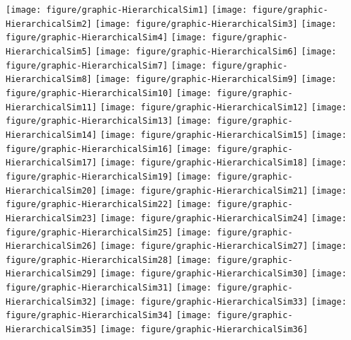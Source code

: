 \documentclass[12pt,letterpaper,oneside]{article}\usepackage{graphicx, color}
\newenvironment{knitrout}{}{} %
\begin{document}
\begin{knitrout}
{\centering \texttt{[image: figure/graphic-HierarchicalSim1]} 
\texttt{[image: figure/graphic-HierarchicalSim2]} 
\texttt{[image: figure/graphic-HierarchicalSim3]} 
\texttt{[image: figure/graphic-HierarchicalSim4]} 
\texttt{[image: figure/graphic-HierarchicalSim5]} 
\texttt{[image: figure/graphic-HierarchicalSim6]} 
\texttt{[image: figure/graphic-HierarchicalSim7]} 
\texttt{[image: figure/graphic-HierarchicalSim8]} 
\texttt{[image: figure/graphic-HierarchicalSim9]} 
\texttt{[image: figure/graphic-HierarchicalSim10]} 
\texttt{[image: figure/graphic-HierarchicalSim11]} 
\texttt{[image: figure/graphic-HierarchicalSim12]} 
\texttt{[image: figure/graphic-HierarchicalSim13]} 
\texttt{[image: figure/graphic-HierarchicalSim14]} 
\texttt{[image: figure/graphic-HierarchicalSim15]} 
\texttt{[image: figure/graphic-HierarchicalSim16]} 
\texttt{[image: figure/graphic-HierarchicalSim17]} 
\texttt{[image: figure/graphic-HierarchicalSim18]} 
\texttt{[image: figure/graphic-HierarchicalSim19]} 
\texttt{[image: figure/graphic-HierarchicalSim20]} 
\texttt{[image: figure/graphic-HierarchicalSim21]} 
\texttt{[image: figure/graphic-HierarchicalSim22]} 
\texttt{[image: figure/graphic-HierarchicalSim23]} 
\texttt{[image: figure/graphic-HierarchicalSim24]} 
\texttt{[image: figure/graphic-HierarchicalSim25]} 
\texttt{[image: figure/graphic-HierarchicalSim26]} 
\texttt{[image: figure/graphic-HierarchicalSim27]} 
\texttt{[image: figure/graphic-HierarchicalSim28]} 
\texttt{[image: figure/graphic-HierarchicalSim29]} 
\texttt{[image: figure/graphic-HierarchicalSim30]} 
\texttt{[image: figure/graphic-HierarchicalSim31]} 
\texttt{[image: figure/graphic-HierarchicalSim32]} 
\texttt{[image: figure/graphic-HierarchicalSim33]} 
\texttt{[image: figure/graphic-HierarchicalSim34]} 
\texttt{[image: figure/graphic-HierarchicalSim35]} 
\texttt{[image: figure/graphic-HierarchicalSim36]} 
}
\end{knitrout}
\end{document}
